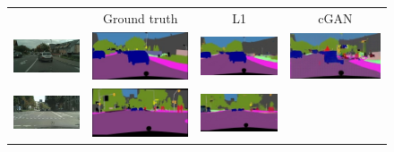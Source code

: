 \begin{figure}

\bgroup 
 \def\arraystretch{0.2} 
 \setlength{}
\begin{tabular}{cccc}
\begin{center}
Input & Ground truth & L1 & cGAN \\ 
\includegraphics[width=0.25\linewidth]{figs/cityscapes_image_to_labels_latex/input_lindau_000000_000019_leftImg8bit.jpg} &
\includegraphics[width=0.25\linewidth]{figs/cityscapes_image_to_labels_latex/gt_lindau_000000_000019_leftImg8bit.jpg} &
\includegraphics[width=0.25\linewidth]{figs/cityscapes_image_to_labels_latex/L1_lindau_000000_000019_leftImg8bit.jpg} &
\includegraphics[width=0.25\linewidth]{figs/cityscapes_image_to_labels_latex/cGAN_lindau_000000_000019_leftImg8bit.jpg} \\ 
\includegraphics[width=0.25\linewidth]{figs/cityscapes_image_to_labels_latex/input_frankfurt_000001_044525_leftImg8bit.jpg} &
\includegraphics[width=0.25\linewidth]{figs/cityscapes_image_to_labels_latex/gt_frankfurt_000001_044525_leftImg8bit.jpg} &
\includegraphics[width=0.25\linewidth]{figs/cityscapes_image_to_labels_latex/L1_frankfurt_000001_044525_leftImg8bit.jpg} &

\end{center}
\end{tabular}
\end{figure}
